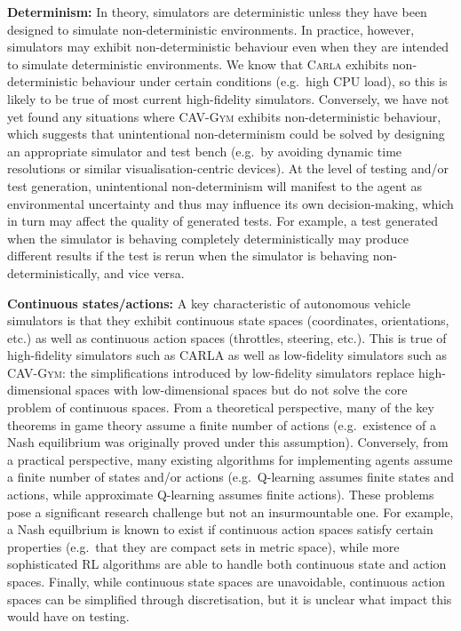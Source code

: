 \documentclass[10pt]{article}
\theoremstyle{plain}
\newenvironment{note}[1][]{\par\smallskip\noindent\textbf{#1}\rmfamily}{\smallskip}
\begin{document}
\begin{note}[Determinism:]
    In theory, simulators are deterministic unless they have been designed to simulate non-deterministic environments.
    In practice, however, simulators may exhibit non-deterministic behaviour even when they are intended to simulate deterministic environments.
    We know that \textsc{Carla} exhibits non-deterministic behaviour under certain conditions (e.g.\ high CPU load), so this is likely to be true of most current high-fidelity simulators.
    Conversely, we have not yet found any situations where \textsc{CAV-Gym} exhibits non-deterministic behaviour, which suggests that unintentional non-determinism could be solved by designing an appropriate simulator and test bench (e.g.\ by avoiding dynamic time resolutions or similar visualisation-centric devices).
    At the level of testing and/or test generation, unintentional non-determinism will manifest to the agent as environmental uncertainty and thus may influence its own decision-making, which in turn may affect the quality of generated tests.
    For example, a test generated when the simulator is behaving completely deterministically may produce different results if the test is rerun when the simulator is behaving non-deterministically, and vice versa.
\end{note}

\begin{note}[Continuous states/actions:]
    A key characteristic of autonomous vehicle simulators is that they exhibit continuous state spaces (coordinates, orientations, etc.) as well as continuous action spaces (throttles, steering, etc.).
    This is true of high-fidelity simulators such as \textsc{CARLA} as well as low-fidelity simulators such as \textsc{CAV-Gym}: the simplifications introduced by low-fidelity simulators replace high-dimensional spaces with low-dimensional spaces but do not solve the core problem of continuous spaces.
    From a theoretical perspective, many of the key theorems in game theory assume a finite number of actions (e.g.\ existence of a Nash equilibrium was originally proved under this assumption).
    Conversely, from a practical perspective, many existing algorithms for implementing agents assume a finite number of states and/or actions (e.g.\ Q-learning assumes finite states and actions, while approximate Q-learning assumes finite actions).
    These problems pose a significant research challenge but not an insurmountable one.
    For example, a Nash equilbrium is known to exist if continuous action spaces satisfy certain properties (e.g.\ that they are compact sets in metric space), while more sophisticated RL algorithms are able to handle both continuous state and action spaces.
    Finally, while continuous state spaces are unavoidable, continuous action spaces can be simplified through discretisation, but it is unclear what impact this would have on testing.
\end{note}
\end{document}

